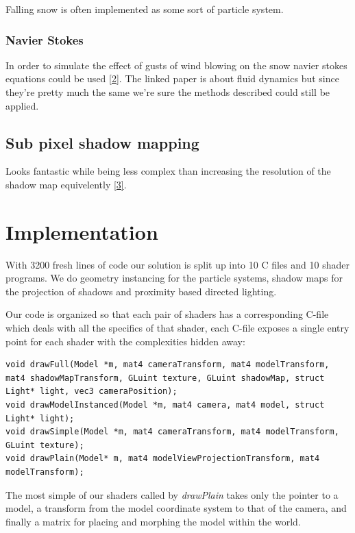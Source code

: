 \documentclass[a4paper,12pt]{article}
\begin{document}
Falling snow is often implemented as some sort of particle system.

\subsubsection{Navier Stokes}

In order to simulate the effect of gusts of wind blowing on the snow navier stokes equations could be used \href{http://www.intpowertechcorp.com/GDC03.pdf}{[2]}. The linked paper is about fluid dynamics but since they're pretty much the same we're sure the methods described could still be applied.


\subsection{Sub pixel shadow mapping}
Looks fantastic while being less complex than increasing the resolution of the shadow map equivelently \href{https://www.youtube.com/watch?v=YSQDNy28SDM}{[3]}.


\section{Implementation}

With 3200 fresh lines of code our solution is split up into 10 C files and 10 shader programs. We do geometry instancing for the particle systems, shadow maps for the projection of shadows and proximity based directed lighting.

Our code is organized so that each pair of shaders has a corresponding C-file which deals with all the specifics of that shader, each C-file exposes a single entry point for each shader with the complexities hidden away:

\begin{lstlisting}[label=lst:entry-points,caption= The entry points of each shader pair\, listed in decreasing complexity.]
void drawFull(Model *m, mat4 cameraTransform, mat4 modelTransform, mat4 shadowMapTransform, GLuint texture, GLuint shadowMap, struct Light* light, vec3 cameraPosition);
void drawModelInstanced(Model *m, mat4 camera, mat4 model, struct Light* light);
void drawSimple(Model *m, mat4 cameraTransform, mat4 modelTransform, GLuint texture);
void drawPlain(Model* m, mat4 modelViewProjectionTransform, mat4 modelTransform);
\end{lstlisting}

The most simple of our shaders called by \emph{drawPlain} takes only the pointer to a model, a transform from the model coordinate system to that of the camera, and finally a matrix for placing and morphing the model within the world.
\end{document}
